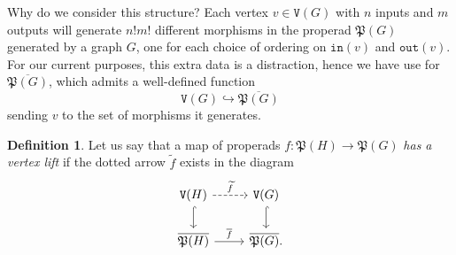 \documentclass{amsart}
\numberwithin{theorem}{subsection}
\theoremstyle{definition}
\newtheorem{definition}[theorem]{Definition}
\newcommand{\out}{\mathtt{out}}
\newcommand{\inp}{\mathtt{in}}
\newcommand{\vertex}{\mathtt{V}}
\begin{document}
Why do we consider this structure?
Each vertex $v \in \vertex(G)$ with $n$ inputs and $m$ outputs will generate $n!m!$ different morphisms in the properad $\mathfrak{P}(G)$ generated by a graph $G$, one for each choice of ordering on $\inp(v)$ and $\out(v)$.
For our current purposes, this extra data is a distraction, hence we have use for $\overline{\mathfrak{P}(G)}$, which admits a well-defined function
\[
	\vertex(G) \hookrightarrow \overline{\mathfrak{P}(G)}
\]
sending $v$ to the set of morphisms it generates.

\begin{definition}\label{definition vertex lift}
Let us say that a map of properads $f : \mathfrak{P}(H) \to \mathfrak{P}(G)$ \emph{has a vertex lift} if the dotted arrow $\widetilde f$ exists in the diagram
\begin{equation}\label{eq vertex lifts}
\begin{tikzcd}
\vertex(H) \dar[hook] \rar[dashed, "\widetilde f"] & \vertex(G) \dar[hook] \\
\overline{\mathfrak{P}(H)} \rar{\overline{f}} & \overline{\mathfrak{P}(G)}.
\end{tikzcd} \end{equation}
\end{definition}
\end{document}
